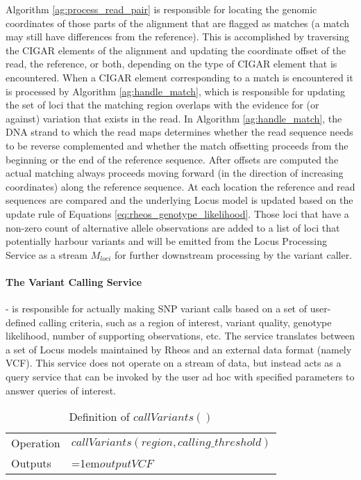 Algorithm \ref{ag:process_read_pair} is responsible for locating the genomic coordinates of those parts of the alignment that are flagged as matches (a match may still have differences from the reference). This is accomplished by traversing the CIGAR elements of the alignment and updating the coordinate offset of the read, the reference, or both, depending on the type of CIGAR element that is encountered. When a CIGAR element corresponding to a match is encountered it is processed by Algorithm \ref{ag:handle_match}, which is responsible for updating the set of loci that the matching region overlaps with the evidence for (or against) variation that exists in the read. In Algorithm \ref{ag:handle_match}, the DNA strand to which the read maps determines whether the read sequence needs to be reverse complemented and whether the match offsetting proceeds from the beginning or the end of the reference sequence. After offsets are computed the actual matching always proceeds moving forward (in the direction of increasing coordinates) along the reference sequence. At each location the reference and read sequences are compared and the underlying Locus model is updated based on the update rule of Equations \ref{eq:rheos_genotype_likelihood}. Those loci that have a non-zero count of alternative allele observations are added to a list of loci that potentially harbour variants and will be emitted from the Locus Processing Service as a stream $M_{loci}$ for further downstream processing by the variant caller.

\paragraph{The Variant Calling Service} - is responsible for actually making SNP variant calls based on a set of user-defined calling criteria, such as a region of interest, variant quality, genotype likelihood, number of supporting observations, etc. The service translates between a set of Locus models maintained by Rheos and an external data format (namely VCF). This service does not operate on a stream of data, but instead acts as a query service that can be invoked by the user ad hoc with specified parameters to answer queries of interest.

\bgroup
\def\arraystretch{1.5}
\begin{table}[!ht]
    \caption{Definition of $callVariants()$}
    \label{tab:op_call_variants}
    {\begin{tabular}{l|p{12cm}}
    \toprule
    Operation & $callVariants(region, calling\_threshold)$\\
    \cline{2-2}
    Outputs & \hangindent=1em$outputVCF$\\
    \bottomrule
    \end{tabular}}
\end{table}
\egroup


